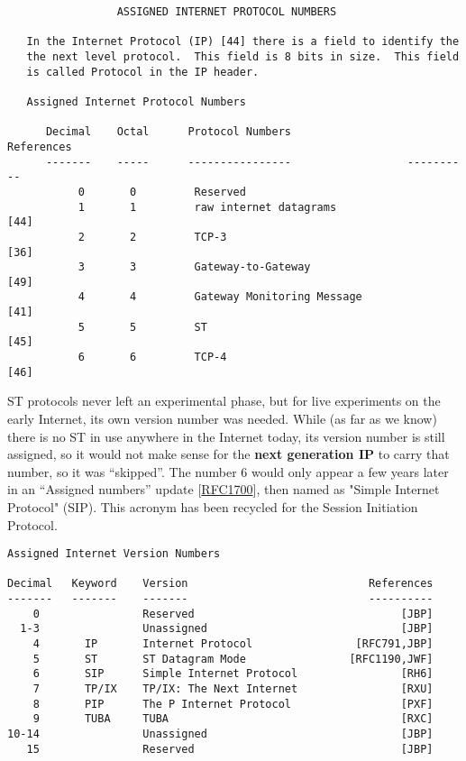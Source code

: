 \documentclass[
]{article}
\begin{document}
\begin{verbatim}
                 ASSIGNED INTERNET PROTOCOL NUMBERS

   In the Internet Protocol (IP) [44] there is a field to identify the
   the next level protocol.  This field is 8 bits in size.  This field
   is called Protocol in the IP header.

   Assigned Internet Protocol Numbers

      Decimal    Octal      Protocol Numbers                  References
      -------    -----      ----------------                  ----------
           0       0         Reserved
           1       1         raw internet datagrams                 [44]
           2       2         TCP-3                                  [36]
           3       3         Gateway-to-Gateway                     [49]
           4       4         Gateway Monitoring Message             [41]
           5       5         ST                                     [45]
           6       6         TCP-4                                  [46]
\end{verbatim}

ST protocols never left an experimental phase, but for live experiments
on the early Internet, its own version number was needed. While (as far
as we know) there is no ST in use anywhere in the Internet today, its
version number is still assigned, so it would not make sense for the
\textbf{next generation IP} to carry that number, so it was ``skipped''.
The number 6 would only appear a few years later in an ``Assigned
numbers'' update
{[}\href{https://www.rfc-editor.org/info/rfc1700}{RFC1700}{]}, then
named as "Simple Internet Protocol" (SIP). This acronym has been
recycled for the Session Initiation Protocol.

\begin{verbatim}
Assigned Internet Version Numbers

Decimal   Keyword    Version                            References
-------   -------    -------                            ----------
    0                Reserved                                [JBP]
  1-3                Unassigned                              [JBP]
    4       IP       Internet Protocol                [RFC791,JBP]
    5       ST       ST Datagram Mode                [RFC1190,JWF]
    6       SIP      Simple Internet Protocol                [RH6]
    7       TP/IX    TP/IX: The Next Internet                [RXU]
    8       PIP      The P Internet Protocol                 [PXF]
    9       TUBA     TUBA                                    [RXC]
10-14                Unassigned                              [JBP]
   15                Reserved                                [JBP]
\end{verbatim}
\end{document}
